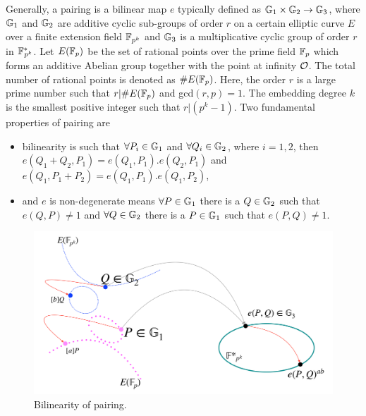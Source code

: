 Generally, a pairing is a bilinear map $e$ typically defined as  ${\mathbb{G}}_{1} \times {\mathbb{G}}_{2} \to {\mathbb{G}}_{3}$, where ${\mathbb{G}}_{1}$ and ${\mathbb{G}}_{2}$ are additive cyclic sub-groups of  order $r$  on a certain elliptic curve $E$ over a finite extension field $\mathbb{F}_{p^k}$ and ${\mathbb{G}}_{3}$ is a multiplicative cyclic group of order $r$ in ${{\mathbb{F}}^{\ast}}_{\!\!\!p^{k}}$.
Let $E({\mathbb{F}}_{p})$ be the set of rational points over the prime field ${\mathbb{F}}_{p}$ which forms an additive Abelian group together with the point at infinity $\cal{O}$. The total number of rational points is denoted as $\#E({\mathbb{F}}_{p})$. Here, the order $r$ is a large prime number such that $r | \#E({\mathbb{F}}_{p})$ and gcd$(r,p)=1$. The embedding degree $k$ is the smallest positive integer such that $r | (p^k -1)$.
Two fundamental properties of pairing are
\begin{itemize}
	\item bilinearity is such that $\forall P_i \in {\mathbb{G}}_{1}$ and $\forall Q_i \in {\mathbb{G}}_{2}$, where $i= 1, 2$, then $e(Q_1+Q_2,P_1) = e(Q_1,P_1). e(Q_2,P_1)$ and $e(Q_1,P_1+P_2) = e(Q_1,P_1). e(Q_1,P_2)$,
	\item and $e$ is non-degenerate means $\forall P \in {\mathbb{G}}_{1}$ there is a $Q \in {\mathbb{G}}_{2}$ such that  $e(Q,P) \neq 1$ and $\forall Q \in {\mathbb{G}}_{2}$ there is a $P \in {\mathbb{G}}_{1}$ such that $e(P,Q) \neq 1$.
\end{itemize}

\begin{figure}
	\centering
	\includegraphics[width=0.7\linewidth]{Figures/bilinearity}
	\caption{Bilinearity of pairing.}
	\label{fig:ch:intro:pairing}
\end{figure}

